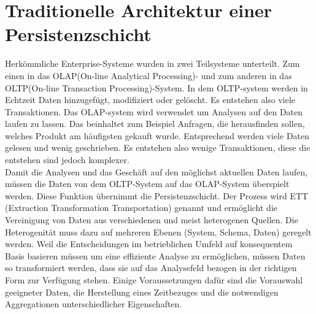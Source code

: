 ﻿\section{Traditionelle Architektur einer Persistenzschicht}
Herkömmliche Enterprise-Systeme wurden in zwei Teilsysteme unterteilt. Zum einen in das OLAP(On-line Analytical Processing)- und zum anderen in das OLTP(On-line Transaction Processing)-System. In dem OLTP-system werden in Echtzeit Daten hinzugefügt, modifiziert oder gelöscht. Es entstehen also viele Transaktionen. Das OLAP-system wird verwendet um Analysen auf den Daten laufen zu lassen. Das beinhaltet zum Beispiel Anfragen, die herausfinden sollen, welches Produkt am häufigsten gekauft wurde. Entsprechend werden viele Daten gelesen und wenig geschrieben. Es entstehen also wenige Transaktionen, diese die entstehen sind jedoch komplexer.
\\
Damit die Analysen und das Geschäft auf den möglichst aktuellen Daten laufen, müssen die Daten von dem OLTP-System auf das OLAP-System überspielt werden. Diese Funktion übernimmt die Persistenzschicht. Der Prozess wird ETT (Extraction Transformation Transportation) genannt und ermöglicht die Vereinigung von Daten aus verschiedenen und meist heterogenen Quellen. Die Heterogenität muss dazu auf mehreren Ebenen (System, Schema, Daten) geregelt werden. Weil die Entscheidungen im betrieblichen Umfeld auf konsequentem Basis basieren müssen um eine effiziente Analyse zu ermöglichen, müssen Daten so transformiert werden, dass sie auf das Analysefeld bezogen in der richtigen Form zur Verfügung stehen. Einige Voraussetzungen dafür sind die Vorauswahl geeigneter Daten, die Herstellung eines Zeitbezuges und die notwendigen Aggregationen unterschiedlicher Eigenschaften.\cite{koppen2014data}
